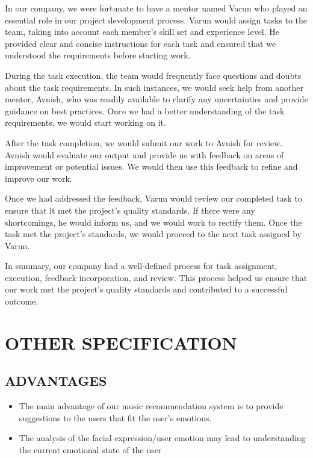 \documentclass[12pt]{report}
\begin{document}
In our company, we were fortunate to have a mentor named Varun who played an essential role in our project development process. Varun would assign tasks to the team, taking into account each member's skill set and experience level. He provided clear and concise instructions for each task and ensured that we understood the requirements before starting work.

During the task execution, the team would frequently face questions and doubts about the task requirements. In such instances, we would seek help from another mentor, Avnish, who was readily available to clarify any uncertainties and provide guidance on best practices. Once we had a better understanding of the task requirements, we would start working on it.

After the task completion, we would submit our work to Avnish for review. Avnish would evaluate our output and provide us with feedback on areas of improvement or potential issues. We would then use this feedback to refine and improve our work.

Once we had addressed the feedback, Varun would review our completed task to ensure that it met the project's quality standards. If there were any shortcomings, he would inform us, and we would work to rectify them. Once the task met the project's standards, we would proceed to the next task assigned by Varun.

In summary, our company had a well-defined process for task assignment, execution, feedback incorporation, and review. This process helped us ensure that our work met the project's quality standards and contributed to a successful outcome.

\clearpage


\centering
\section{OTHER SPECIFICATION}

\justifying
\setlength{\parindent}{4em}
\setlength{\parskip}{0.5em}
\renewcommand{\baselinestretch}{1.5}

\vspace{0.5cm}
\normalsize
\subsection{  ADVANTAGES}
\begin{itemize}
\item The main advantage of our music recommendation system is to provide 
suggestions to the users that fit the user's emotions.\\
\item The analysis of the facial expression/user emotion may lead to understanding the 
current emotional state of the user
\end{itemize}
\end{document}

